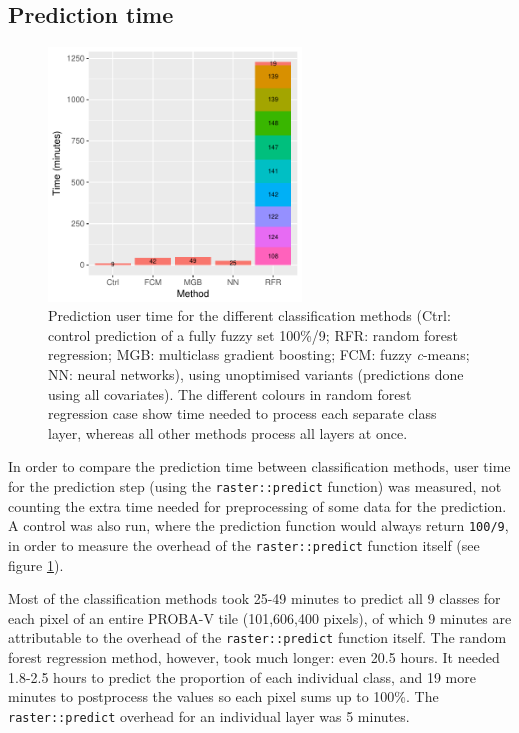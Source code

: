 \documentclass[a4paper,12pt]{scrbook}
\begin{document}
\subsection{Prediction time}

\begin{figure}
  \centering
  \includegraphics[width=0.6\textwidth]{thesis-figures/timing}
  \caption{Prediction user time for the different classification methods (Ctrl: control prediction of a fully fuzzy set 100\%/9; RFR: random forest regression; MGB: multiclass gradient boosting; FCM: fuzzy \textit{c}-means; NN: neural networks), using unoptimised variants (predictions done using all covariates). The different colours in random forest regression case show time needed to process each separate class layer, whereas all other methods process all layers at once.}
  \label{fig-timing}
\end{figure}

In order to compare the prediction time between classification methods, user time for the prediction step (using the \texttt{raster::predict} function) was measured, not counting the extra time needed for preprocessing of some data for the prediction. A control was also run, where the prediction function would always return \texttt{100/9}, in order to measure the overhead of the \texttt{raster::predict} function itself (see figure \ref{fig-timing}).

Most of the classification methods took 25-49 minutes to predict all 9 classes for each pixel of an entire PROBA-V tile (101,606,400 pixels), of which 9 minutes are attributable to the overhead of the \texttt{raster::predict} function itself. The random forest regression method, however, took much longer: even 20.5 hours. It needed 1.8-2.5 hours to predict the proportion of each individual class, and 19 more minutes to postprocess the values so each pixel sums up to 100\%. The \texttt{raster::predict} overhead for an individual layer was 5 minutes.
\end{document}
